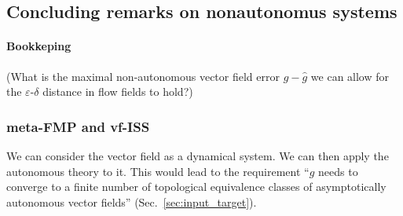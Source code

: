 \documentclass{article}
\newcommand{\ascomment}[1]{\textcolor{ascolor}{(#1)}}
\newcommand{\reals}{\mathbb{R}}
\newcounter{ct}
\begin{document}


%
%





    
\subsection{Concluding remarks on nonautonomus systems}

\paragraph{Bookkeping}
\ascomment{What is the maximal non-autonomous vector field error $g-\hat g$ we can allow for the $\varepsilon$-$\delta$ distance in flow fields to hold?}



\subsubsection{meta-FMP and vf-ISS}
We can consider the vector field as a dynamical system.
We can then apply the autonomous theory to it.
This would lead to the requirement ``$g$ needs to converge to a finite number of topological equivalence classes of asymptotically autonomous vector fields'' (Sec.~\ref{sec:input_target}).
\end{document}
